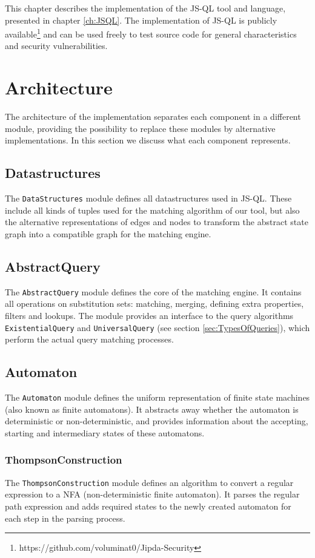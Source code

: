 This chapter describes the implementation of the JS-QL tool and language, presented in chapter \ref{ch:JSQL}. The implementation of JS-QL is publicly available\footnote{https://github.com/voluminat0/Jipda-Security} and can be used freely to test source code for general characteristics and security vulnerabilities.


\section{Architecture}
The architecture of the implementation  separates each component in a different module, providing the possibility to replace these modules by alternative implementations. In this section we discuss what each component represents.

\subsection*{Datastructures}
The \texttt{DataStructures} module defines all datastructures used in JS-QL. These include all kinds of tuples used for the matching algorithm of our tool, but also the alternative representations of edges and nodes to transform the abstract state graph into a compatible graph for the matching engine.

\subsection*{AbstractQuery}
The \texttt{AbstractQuery} module defines the core of the matching engine. It contains all operations on substitution sets: matching, merging, defining extra properties, filters and lookups. The module provides an interface to the query algorithms \texttt{ExistentialQuery} and \texttt{UniversalQuery} (see section \ref{sec:TypesOfQueries}), which perform the actual query matching processes.

\subsection*{Automaton}
The \texttt{Automaton} module defines the uniform representation of finite state machines (also known as finite automatons). It abstracts away whether the automaton is deterministic or non-deterministic, and provides information about the accepting, starting and intermediary states of these automatons.

\subsubsection*{ThompsonConstruction}
The \texttt{ThompsonConstruction} module defines an algorithm to convert a regular expression to a NFA (non-deterministic finite automaton). It parses the regular path expression and adds required states to the newly created automaton for each step in the parsing process.

